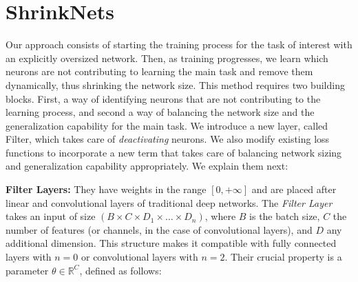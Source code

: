 \documentclass[sigconf]{acmart}
\newcommand{\srm}[1]{\textcolor{red}{{\bf Sam:} #1}}
\newcommand{\gl}[1]{\textcolor{violet}{{\bf Gl:} #1}}
\begin{document}
\section{ShrinkNets}

Our approach consists of starting the training process for the task of interest
with an explicitly oversized network. Then, as training progresses, we learn
which neurons are not contributing to learning the main task and remove them
dynamically, thus shrinking the network size. This method requires two building
blocks. First, a way of identifying neurons that are not contributing to the
learning process, and second a way of balancing the network size and the
generalization capability for the main task. We introduce a new layer, called
\textsf{Filter}, which takes care of \emph{deactivating} neurons. We also modify
existing loss functions to incorporate a new term that takes care of balancing
network sizing and generalization capability appropriately. We explain them
next:

%
%
%


\textbf{Filter Layers: } They have weights in the range $[0,+\infty]$ and are placed after
linear and convolutional layers of traditional deep networks.
The \textit{Filter Layer} takes an input of size $\left(B \times C \times D_1
\times \dots \times D_n\right)$, where $B$ is the batch size, $C$ the number of
features (or channels, in the case of convolutional layers), and $D$ any additional dimension. This structure makes
it compatible with fully connected layers with $n=0$ or convolutional layers
with $n=2$. Their crucial property is a parameter $\theta \in \mathbb{R}^C$,
defined as follows:
\end{document}

